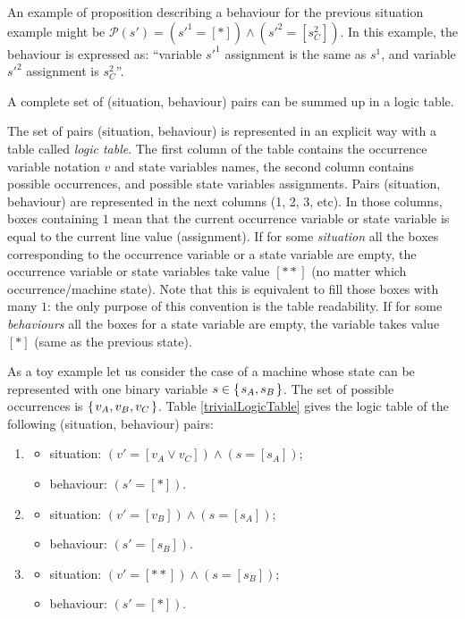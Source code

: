 An example of proposition describing a behaviour 
for the previous situation example might be 
$\mathcal{P}(s') = (s'^{1} = [*]) \land (s'^{2} = [s^2_{C}])$. 
In this example, the behaviour is expressed as: ``variable $s'^{1}$ assignment 
is the same as $s^{1}$, and variable $s'^{2}$ assignment is $s^2_{C}$''.

A complete set of (situation, behaviour) pairs can be summed up in a logic table.
\begin{Def}
The set of pairs (situation, behaviour) is represented 
in an explicit way with a table called \emph{logic table}. 
The first column of the table contains the occurrence variable notation $v$ 
and state variables names, 
the second column contains possible occurrences, 
and possible state variables assignments. 
Pairs (situation, behaviour) are represented in the next columns (1, 2, 3, etc).
In those columns, boxes containing $1$ mean that the current occurrence variable
or state variable is equal to the current line value (assignment). 
If for some \emph{situation} all the boxes corresponding to the 
occurrence variable or a state variable are empty, 
the occurrence variable or state variables take 
value $[**]$ (no matter which occurrence/machine state). 
Note that this is equivalent to fill 
those boxes with many $1$: the only purpose of this 
convention is the table readability.
If for some \emph{behaviours} all the boxes 
for a state variable are empty, the variable takes 
value $[*]$ (same as the previous state). 
\end{Def}
As a toy example let us consider the case of a machine whose state can be represented with one binary variable $s \in \left\{ \left. s_A,s_B \right. \right\}$. 
The set of possible occurrences is $\left\{ \left. v_A,v_B,v_C \right. \right\}$. 
Table \ref{trivialLogicTable} gives the logic table of the following
(situation, behaviour) pairs: 
\begin{enumerate}
\item
\begin{itemize}
\item situation: $(v' = [v_{A} \lor v_{C}]) \land (s = [s_{A}])$; 
\item behaviour: $(s' = [*])$.
\end{itemize}
\item
\begin{itemize}
\item situation: $(v' = [v_{B}]) \land (s = [s_{A}])$;
\item behaviour: $(s' = [s_B])$.
\end{itemize}
\item
\begin{itemize}
\item situation: $(v' = [**]) \land (s = [s_{B}])$;
\item behaviour: $(s' = [*])$.
\end{itemize}
\end{enumerate}
